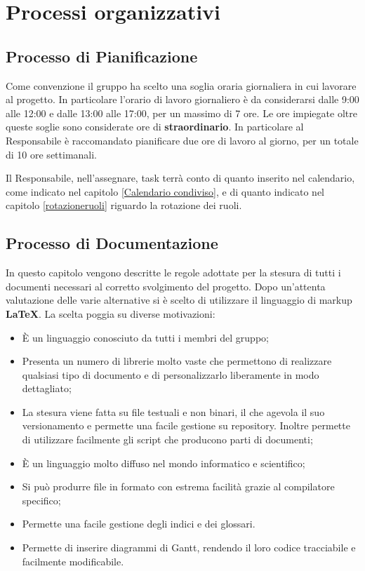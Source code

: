 \section{Processi organizzativi}

\subsection{Processo di Pianificazione}

Come convenzione il gruppo ha scelto una soglia oraria giornaliera in cui lavorare al progetto. In particolare l'orario di lavoro giornaliero è da considerarsi dalle 9:00 alle 12:00 e dalle 13:00 alle 17:00, per un massimo di 7 ore. Le ore impiegate oltre queste soglie sono considerate ore di \textbf{straordinario}. In particolare al Responsabile è raccomandato pianificare due ore di lavoro al giorno, per un totale di 10 ore settimanali.
		
Il Responsabile, nell'assegnare, task terrà conto di quanto inserito nel calendario, come indicato nel capitolo \ref{Calendario condiviso}, e di quanto indicato nel capitolo \ref{rotazioneruoli} riguardo la rotazione dei ruoli. 

\subsection{Processo di Documentazione}

In questo capitolo vengono descritte le regole adottate per la stesura di tutti i documenti necessari al corretto svolgimento del progetto. Dopo un'attenta valutazione delle varie alternative si è scelto di utilizzare il linguaggio di markup \textbf{\LaTeX{}}. La scelta poggia su diverse motivazioni:

\begin{itemize}

	\item È un linguaggio conosciuto da tutti i membri del gruppo;
	\item Presenta un numero di librerie molto vaste che permettono di realizzare qualsiasi tipo di documento e di personalizzarlo liberamente in modo dettagliato;
	\item La stesura viene fatta su file testuali e non binari, il che agevola il suo versionamento e permette una facile gestione su repository. Inoltre permette di utilizzare facilmente gli script che producono parti di documenti;
	\item È un linguaggio molto diffuso nel mondo informatico e scientifico;
	\item Si può produrre file in formato  con estrema facilità grazie al compilatore specifico;
	\item Permette una facile gestione degli indici e dei glossari.
	\item Permette di inserire diagrammi di Gantt, rendendo il loro codice tracciabile e facilmente modificabile.

\end{itemize}


